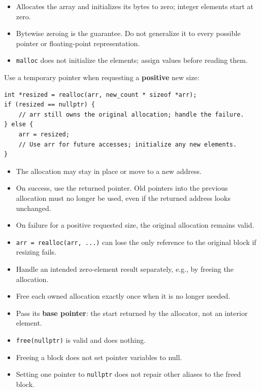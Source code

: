\documentclass[11pt,a4paper]{article}
\providecommand{\tightlist}{\setlength{\itemsep}{0pt}\setlength{\parskip}{0pt}}
\begin{document}
\begin{itemize}
\tightlist
\item
  Allocates the array and initializes its bytes to zero; integer elements start at zero.
\item
  Bytewise zeroing is the guarantee. Do not generalize it to every possible pointer or floating-point representation.
\item
  \texttt{malloc} does not initialize the elements; assign values before reading them.
\end{itemize}

\label{realloc}
\hypertarget{realloc}{}

Use a temporary pointer when requesting a \textbf{positive} new size:

\begin{lstlisting}[style=cscode]
int *resized = realloc(arr, new_count * sizeof *arr);
if (resized == nullptr) {
    // arr still owns the original allocation; handle the failure.
} else {
    arr = resized;
    // Use arr for future accesses; initialize any new elements.
}
\end{lstlisting}

\begin{itemize}
\tightlist
\item
  The allocation may stay in place or move to a new address.
\item
  On success, use the returned pointer. Old pointers into the previous allocation must no longer be used, even if the returned address looks unchanged.
\item
  On failure for a positive requested size, the original allocation remains valid.
\item
  \texttt{arr\ =\ realloc(arr,\ ...)} can lose the only reference to the original block if resizing fails.
\item
  Handle an intended zero-element result separately, e.g., by freeing the allocation.
\end{itemize}

\label{freeing-memory-and-common-mistakes}
\hypertarget{freeing-memory-and-common-mistakes}{}

\label{rules-for-free}
\hypertarget{rules-for-free}{}

\begin{itemize}
\tightlist
\item
  Free each owned allocation exactly once when it is no longer needed.
\item
  Pass its \textbf{base pointer}: the start returned by the allocator, not an interior element.
\item
  \texttt{free(nullptr)} is valid and does nothing.
\item
  Freeing a block does not set pointer variables to null.
\item
  Setting one pointer to \texttt{nullptr} does not repair other aliases to the freed block.
\end{itemize}
\end{document}
